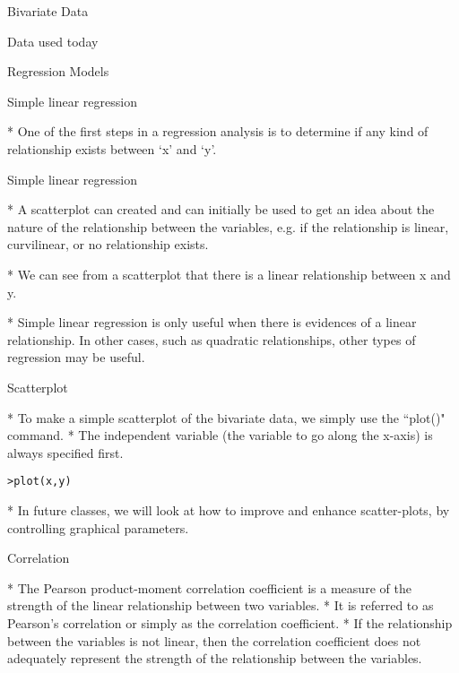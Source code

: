 \begin{slide}{Bivariate Data}
\begin{slide}{Data used today}
\begin{slide}{Regression Models}
\begin{slide}{Simple linear regression}
\begin{itemize}
* One of the first steps in a regression analysis is to determine if any
kind of relationship exists between `x' and `y'.



\end{itemize}

\begin{slide}{Simple linear regression}
\begin{itemize}

* A scatterplot can created and can initially be used to get an idea
about the nature of the relationship between the variables, e.g. if
the relationship is linear, curvilinear, or no relationship exists.

* We can see from a scatterplot that there is a linear relationship
between x and y.

* Simple linear regression is only useful when there is evidences of a linear relationship.
In other cases, such as quadratic relationships, other types of regression may be useful.

\end{itemize}


\begin{slide}{Scatterplot}
\begin{itemize}
* To make a simple scatterplot of the bivariate data, we simply use the
``plot()" command. * The independent variable (the variable to go along the x-axis) is always specified first.
\begin{verbatim}
>plot(x,y)
\end{verbatim}
* In future classes, we will look at how to improve and enhance scatter-plots, by controlling graphical parameters.
\end{itemize}


\begin{slide}{Correlation}
\begin{itemize}

* The Pearson product-moment correlation coefficient is a measure of the strength of the linear relationship between two variables. *  It is referred to as Pearson's correlation or simply as the correlation coefficient. * If the relationship between the variables is not linear, then the correlation coefficient does not adequately represent the strength of the relationship between the variables.
\end{itemize}



\end{slide}
\end{slide}
\end{slide}
\end{slide}
\end{slide}
\end{slide}
\end{slide}
